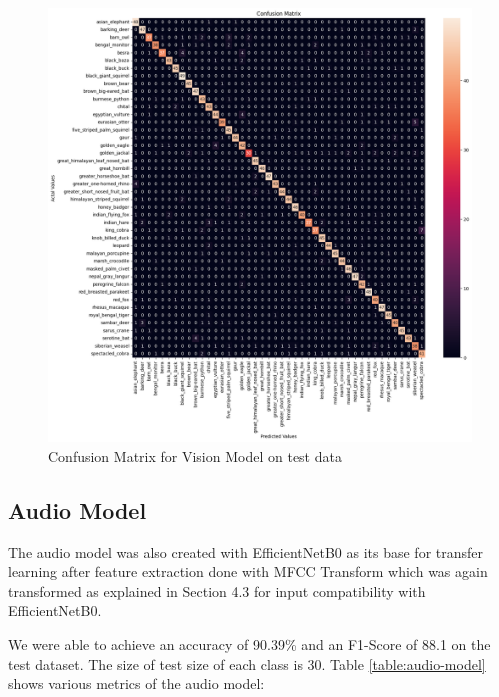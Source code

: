 \documentclass[fleqn, 10pt, twoside]{IOEGC}
\begin{document}
\begin{figure}[t] %
	\centering
	\begin{minipage}{\textwidth} %
		\includegraphics[scale=0.53]{Graphics/vision_cm.png} %
		\caption{Confusion Matrix for Vision Model on test data}
		\label{cm_vision}
	\end{minipage}
\end{figure}




\clearpage



\subsection{Audio Model}

The audio model was also created with EfficientNetB0 as its base for transfer learning after feature extraction done with MFCC Transform which was again transformed as explained in Section 4.3 for input compatibility with EfficientNetB0.
\par
We were able to achieve an accuracy of 90.39\% and an F1-Score of 88.1 on the test dataset. The size of test size of each class is 30. Table \ref{table:audio-model} shows various metrics of the audio model:
\end{document}
